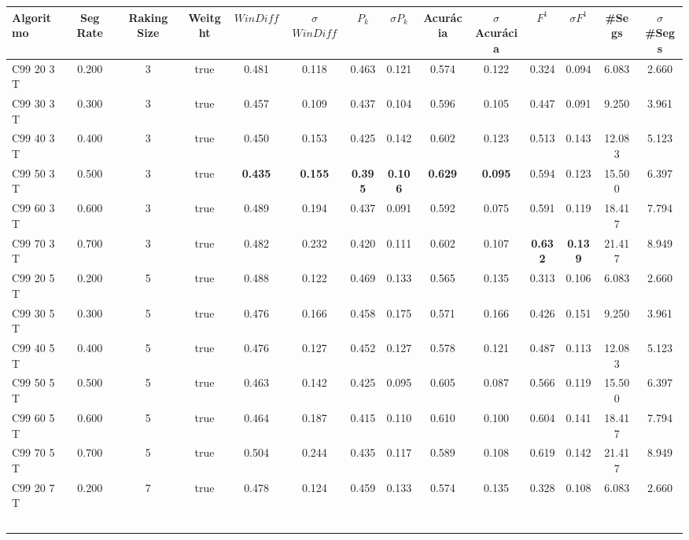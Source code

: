 \documentclass{article}
\begin{document}
\newpage
\tiny\begin{longtable}[c]{|l|c|c|c|c|c|c|c|c|c|c|c|c|c|} 
\hline 
Algoritmo & Seg Rate & Raking Size & Weitght & $WinDiff$ & $\sigma$$WinDiff$ & $P_k$ & $\sigma$$P_k$ & Acurácia & $\sigma$Acurácia & $F^1$ & $\sigma$$F^1$ & \#Segs & $\sigma$\#Segs\\ \hline 
C99 20  3 T & 0.200 & 3 & true & 0.481 & 0.118 & 0.463 & 0.121 & 0.574 & 0.122 & 0.324 & 0.094 & 6.083 & 2.660  \\ \hline 
 C99 30  3 T & 0.300 & 3 & true & 0.457 & 0.109 & 0.437 & 0.104 & 0.596 & 0.105 & 0.447 & 0.091 & 9.250 & 3.961  \\ \hline 
 C99 40  3 T & 0.400 & 3 & true & 0.450 & 0.153 & 0.425 & 0.142 & 0.602 & 0.123 & 0.513 & 0.143 & 12.083 & 5.123  \\ \hline 
 C99 50  3 T & 0.500 & 3 & true & \cellcolor{gray!20} \textbf{0.435} & \cellcolor{gray!20} \textbf{0.155} & \cellcolor{gray!20} \textbf{0.395} & \cellcolor{gray!20} \textbf{0.106} & \cellcolor{gray!20} \textbf{0.629} & \cellcolor{gray!20} \textbf{0.095} & 0.594 & 0.123 & 15.500 & 6.397  \\ \hline 
 C99 60  3 T & 0.600 & 3 & true & 0.489 & 0.194 & 0.437 & 0.091 & 0.592 & 0.075 & 0.591 & 0.119 & 18.417 & 7.794  \\ \hline 
 C99 70  3 T & 0.700 & 3 & true & 0.482 & 0.232 & 0.420 & 0.111 & 0.602 & 0.107 & \cellcolor{gray!20} \textbf{0.632} & \cellcolor{gray!20} \textbf{0.139} & 21.417 & 8.949  \\ \hline 
 C99 20  5 T & 0.200 & 5 & true & 0.488 & 0.122 & 0.469 & 0.133 & 0.565 & 0.135 & 0.313 & 0.106 & 6.083 & 2.660  \\ \hline 
 C99 30  5 T & 0.300 & 5 & true & 0.476 & 0.166 & 0.458 & 0.175 & 0.571 & 0.166 & 0.426 & 0.151 & 9.250 & 3.961  \\ \hline 
 C99 40  5 T & 0.400 & 5 & true & 0.476 & 0.127 & 0.452 & 0.127 & 0.578 & 0.121 & 0.487 & 0.113 & 12.083 & 5.123  \\ \hline 
 C99 50  5 T & 0.500 & 5 & true & 0.463 & 0.142 & 0.425 & 0.095 & 0.605 & 0.087 & 0.566 & 0.119 & 15.500 & 6.397  \\ \hline 
 C99 60  5 T & 0.600 & 5 & true & 0.464 & 0.187 & 0.415 & 0.110 & 0.610 & 0.100 & 0.604 & 0.141 & 18.417 & 7.794  \\ \hline 
 C99 70  5 T & 0.700 & 5 & true & 0.504 & 0.244 & 0.435 & 0.117 & 0.589 & 0.108 & 0.619 & 0.142 & 21.417 & 8.949  \\ \hline 
 C99 20  7 T & 0.200 & 7 & true & 0.478 & 0.124 & 0.459 & 0.133 & 0.574 & 0.135 & 0.328 & 0.108 & 6.083 & 2.660  \\ \hline 
$$
\end{longtable}
\end{document}
